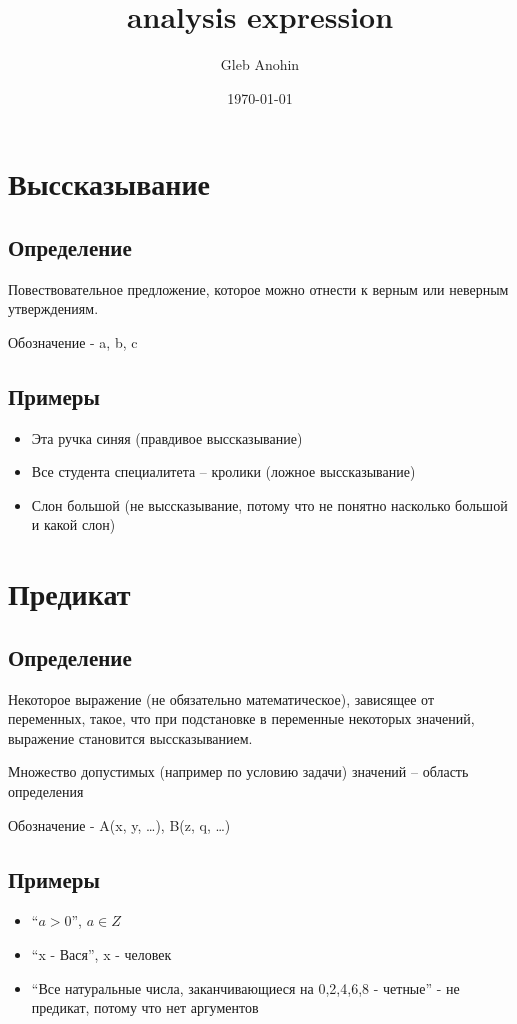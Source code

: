 \documentclass[letterpaper]{article}
\author{Gleb Anohin}
\date{\today}
\title{analysis expression}
\begin{document}
\maketitle
\tableofcontents

\section{Выссказывание}
\label{sec:orgb00e563}
\subsection{Определение}
\label{sec:orgb6f77d0}
Повествовательное предложение, которое можно отнести к верным или неверным утверждениям.

Обозначение - a, b, c
\subsection{Примеры}
\label{sec:orge9f71ba}
\begin{itemize}
\item Эта ручка синяя (правдивое выссказывание)
\item Все студента специалитета -- кролики (ложное выссказывание)
\item Слон большой (не выссказывание, потому что не понятно насколько большой и какой слон)
\end{itemize}
\section{Предикат}
\label{sec:org2715b35}
\subsection{Определение}
\label{sec:org0cf3c4b}
Некоторое выражение (не обязательно математическое), зависящее от переменных, такое, что при подстановке в переменные некоторых значений, выражение становится выссказыванием.

Множество допустимых (например по условию задачи) значений -- область определения

Обозначение - A(x, y, \ldots{}), B(z, q, \ldots{})
\subsection{Примеры}
\label{sec:org834a567}
\begin{itemize}
\item ``\(a > 0\)'', \(a \in Z\)
\item ``x - Вася'', x - человек
\item ``Все натуральные числа, заканчивающиеся на 0,2,4,6,8 - четные'' - не предикат, потому что нет аргументов
\end{itemize}
\end{document}
